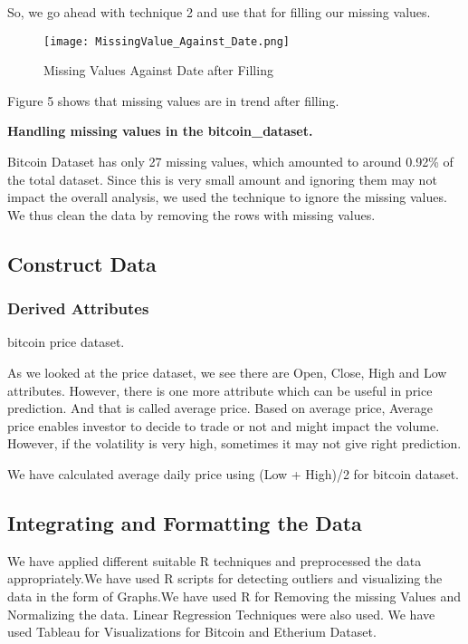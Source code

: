 \documentclass{article}
\begin{document}
So, we go ahead with technique 2 and use that for filling our missing values.

\begin{figure}
    \centering
    \texttt{[image: MissingValue\_Against\_Date.png]}
    \caption{Missing Values Against Date after Filling}
    \label{fig:my_label}
\end{figure}

Figure 5 shows that missing values are in trend after filling.\newline

\textbf{Handling missing values in the bitcoin\_dataset.}

Bitcoin Dataset has only 27 missing values, which amounted to around 0.92\% of the total dataset. Since this is very small amount and ignoring them may not impact the overall analysis, we used
the technique to ignore the missing values.\\

We thus clean the data by removing the rows with missing values.


\subsection{Construct Data}
\subsubsection{Derived Attributes}

bitcoin price dataset.

As we looked at the price dataset, we see there are Open, Close, High and Low attributes. However, there is one more attribute which can be useful in price prediction. And that is called average price.
Based on average price, Average price enables investor to decide to trade or not and might impact the
volume. However, if the volatility is very high, sometimes it may not give right prediction.

We have calculated average daily price using (Low + High)/2 for bitcoin dataset.


\subsection{Integrating and Formatting the Data}

We have applied different suitable R techniques and preprocessed the data appropriately.We have used R scripts for detecting outliers and visualizing the data in the form of Graphs.We have used R for Removing the missing Values and Normalizing the data. Linear Regression Techniques were also used. We have used Tableau for Visualizations for Bitcoin and Etherium Dataset. 
\end{document}
